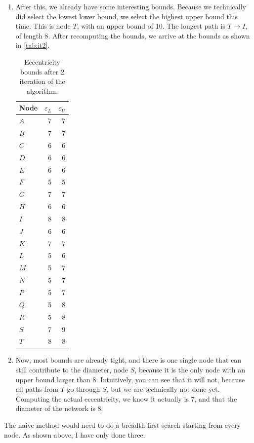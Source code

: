 \documentclass[12pt,a4paper,hidelinks]{article}
\begin{document}
\begin{enumerate}
	\item After this, we already have some interesting bounds.  Because we technically did select the lowest lower bound, we select the highest upper bound this time. This is node $T$, with an upper bound of 10. The longest path is $T \rightarrow I$, of length 8. After recomputing the bounds, we arrive at the bounds as shown in \autoref{tab:it2}.
	
		\begin{table}
			\centering
			\begin{tabular}{l | r | r}
				Node & $\varepsilon_L$ & $\varepsilon_U$ \\
				\hline
				$A$ & 7 & 7 \\
				$B$ & 7 & 7 \\
				$C$ & 6 & 6 \\
				$D$ & 6 & 6 \\
				$E$ & 6 & 6 \\
				$F$ & 5 & 5 \\
				$G$ & 7 & 7 \\
				$H$ & 6 & 6 \\
				$I$ & 8 & 8 \\
				$J$ & 6 & 6 \\
				$K$ & 7 & 7 \\
				$L$ & 5 & 6 \\
				$M$ & 5 & 7 \\
				$N$ & 5 & 7 \\
				$P$ & 5 & 7 \\
				$Q$ & 5 & 8 \\
				$R$ & 5 & 8 \\
				$S$ & 7 & 9 \\
				$T$ & 8 & 8 \\
			\end{tabular}
			\caption{Eccentricity bounds after 2 iteration of the algorithm.}
			\label{tab:it2}
		\end{table}
	
	\item Now, most bounds are already tight, and there is one single node that can still contribute to the diameter, node $S$, because it is the only node with an upper bound larger than 8. Intuitively, you can see that it will not, because all paths from $T$ go through $S$, but we are technically not done yet. Computing the actual eccentricity, we know it actually is 7, and that the diameter of the network is 8.
\end{enumerate}

The naive method would need to do a breadth first search starting from every node. As shown above, I have only done three.
\end{document}
